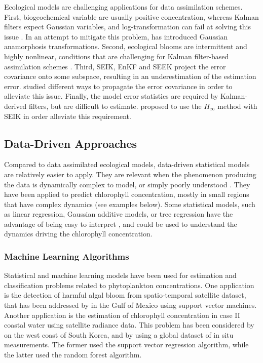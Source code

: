 Ecological models are challenging applications for data assimilation schemes. 
First, biogeochemical variable are usually positive concentration, whereas 
Kalman filters expect Gaussian variables, and log-transformation can fail at 
solving this issue \citep{Ciavatta2011}. In an attempt to mitigate this problem, 
\citet{Fontana2013} has introduced Gaussian anamorphosis transformations. 
Second, ecological blooms are intermittent and highly nonlinear, conditions that 
are challenging for Kalman filter-based assimilation schemes 
\citep{Triantafyllou2012, Korres2012}. Third, SEIK, EnKF and SEEK project the 
error covariance onto some subspace, resulting in an underestimation of the 
estimation error. \citet{Butenschon2012} studied different ways to propagate the 
error covariance in order to alleviate this issue. Finally, the model error 
statistics are required by Kalman-derived filters, but are difficult to 
estimate. \citet{Triantafyllou2012} proposed to use the $H_\infty$ method with 
SEIK in order alleviate this requirement.

\subsection{Data-Driven Approaches}

Compared to data assimilated ecological models, data-driven statistical models 
are relatively easier to apply. They are relevant when the phenomenon producing 
the data is dynamically complex to model, or simply poorly understood 
\cite{Gareth2013}. They have been applied to predict chlorophyll concentration, 
mostly in small regions that have complex dynamics (see examples below). Some 
statistical models, such as linear regression, Gaussian additive models, or tree 
regression have the advantage of being easy to interpret \citep{Gareth2013}, and 
could be used to understand the dynamics driving the chlorophyll concentration.

\subsubsection{Machine Learning Algorithms}

Statistical and machine learning models have been used for estimation and 
classification problems related to phytoplankton concentrations. One application 
is the detection of harmful algal bloom from spatio-temporal satellite dataset, 
that has been addressed by \citet{Gokaraju2011} in the Gulf of Mexico using 
support vector machines. Another application is the estimation of chlorophyll 
concentration in case II coastal water using satellite radiance data. This 
problem has been considered by \citet{Kim2014} on the west coast of South Korea, 
and by \citet{Camps-Valls2006} using a global dataset of in situ measurements. 
The former used the support vector regression algorithm, while the latter used 
the random forest algorithm.

